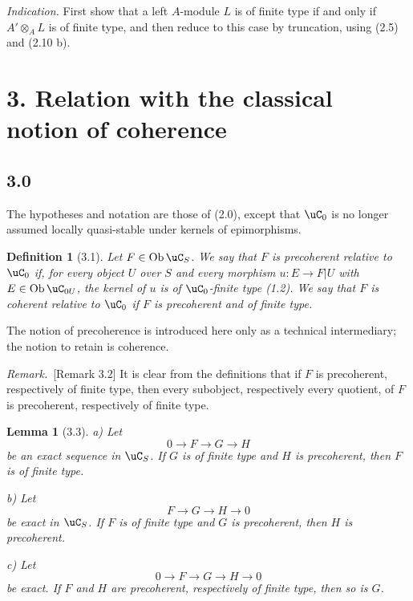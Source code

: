 \documentclass[11pt]{article}
\theoremstyle{plain}
\newtheorem*{lemma*}{Lemma}
\newtheorem*{definition*}{Definition}
\theoremstyle{definition}
\theoremstyle{remark}
\newenvironment{remarktext}{\par\medskip\noindent\textit{Remark.}\ }{\par\medskip}
\DeclareMathOperator{\ob}{Ob}
\begin{document}
\emph{Indication.} First show that a left $A$-module $L$ is of finite type if and only if $A'\otimes_A L$ is of finite type, and then reduce to this case by truncation, using (2.5) and (2.10 b).

\section*{3. Relation with the classical notion of coherence}

\subsection*{3.0}
The hypotheses and notation are those of (2.0), except that $\uC_0$ is no longer assumed locally quasi-stable under kernels of epimorphisms.

\begin{definition*}[3.1]
Let $F\in\ob\uC_S$. We say that $F$ is \emph{precoherent} relative to $\uC_0$ if, for every object $U$ over $S$ and every morphism $u:E\to F|U$ with $E\in\ob\uC_{0U}$, the kernel of $u$ is of $\uC_0$-finite type (1.2). We say that $F$ is \emph{coherent} relative to $\uC_0$ if $F$ is precoherent and of finite type.
\end{definition*}

The notion of precoherence is introduced here only as a technical intermediary; the notion to retain is coherence.

\begin{remarktext}[Remark 3.2]
It is clear from the definitions that if $F$ is precoherent, respectively of finite type, then every subobject, respectively every quotient, of $F$ is precoherent, respectively of finite type.
\end{remarktext}

\begin{lemma*}[3.3]
\textup{a)} Let
\[
0\longrightarrow F\longrightarrow G\longrightarrow H
\]
be an exact sequence in $\uC_S$. If $G$ is of finite type and $H$ is precoherent, then $F$ is of finite type.

\textup{b)} Let
\[
F\longrightarrow G\longrightarrow H\longrightarrow0
\]
be exact in $\uC_S$. If $F$ is of finite type and $G$ is precoherent, then $H$ is precoherent.

\textup{c)} Let
\[
0\longrightarrow F\longrightarrow G\longrightarrow H\longrightarrow0
\]
be exact. If $F$ and $H$ are precoherent, respectively of finite type, then so is $G$.
\end{lemma*}
\end{document}
